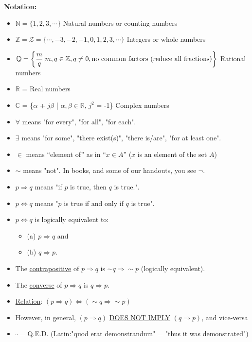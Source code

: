 \documentclass[letterpaper]{article}
\newcommand{\real}{\mathbb R}  %
\newcommand{\whole}{\mathbb Z}    %
\begin{document}
\noindent\textbf{Notation:}~
    \begin{itemize}
        \item[] $\mathbb{N} = \{1,2,3,\dotsb\}$ Natural numbers or counting numbers
        \item[] $\mathbb{Z} = \mathcal{Z} = \{\dotsb, -3, -2, -1, 0, 1, 2, 3, \dotsb\}$ Integers or whole numbers
        \item[] $\mathbb{Q} = \left\{\dfrac{m}{q} | m,q \in \whole, q \neq 0, \textnormal{no common factors (reduce all fractions)}\right\}$ Rational numbers
        \item[] $\mathbb{R}$ = Real numbers
        \item[] $\mathbb{C}$ = \{$\alpha$ + $j\beta$ | $\alpha, \beta \in \real$, $j^2$ = -1\} Complex numbers
        \item[] $\forall$ means "for every", "for all", "for each".
        \item[] $\exists$ means "for some", "there exist(s)", "there is/are", "for at least one".
        \item[] $\in$ means ``element of'' as in ``$x\in A$'' ($x$ is an element of the set $A$)
        \item[] $\sim$ means "not".  In books, and some of our handouts, you see $\neg$.
        \item[] $p \Rightarrow q$ means "if $p$ is true, then $q$ is true.".
        \item[] $p \iff q$ means "$p$ is true if and only if $q$ is true".
        \item[] $p \iff q$ is logically equivalent to:
        \begin{itemize}
            \item[] (a) $p \Rightarrow q$ and\ %
            \item[] (b) $q \Rightarrow p$.
        \end{itemize}
        \item[] The \underline{contrapositive} of $p \Rightarrow q$ is $\sim q \Rightarrow \sim p$ (logically equivalent).
        \item[] The \underline{converse} of $p \Rightarrow q$ is $q \Rightarrow p$.
        \item[] \underline{Relation}: $(p \Rightarrow q) \Leftrightarrow (\sim q \Rightarrow \sim p)$
        \item[] However, in general, $(p \Rightarrow q)$ \underline{DOES NOT IMPLY} $(q \Rightarrow p)$, and vice-versa
        \item[] $\square$ = Q.E.D. (Latin:"quod erat demonstrandum" = "thus it was demonstrated") %
    \end{itemize}
\end{document}

